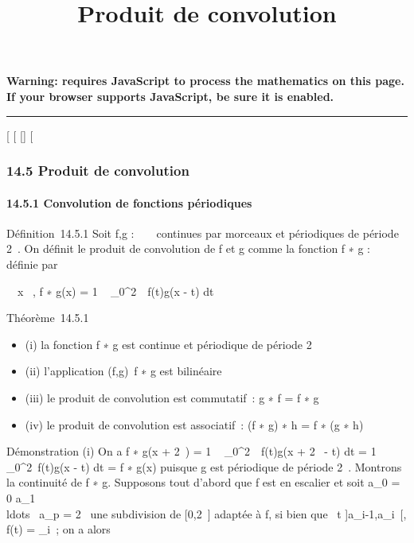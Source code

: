 \documentclass[]{article}
\title{Produit de convolution}
\author{}
\date{}
\begin{document}
\maketitle

\textbf{Warning: 
requires JavaScript to process the mathematics on this page.\\ If your
browser supports JavaScript, be sure it is enabled.}

\begin{center}\rule{3in}{0.4pt}\end{center}

[
[
[]
[

\subsubsection{14.5 Produit de convolution}

\paragraph{14.5.1 Convolution de fonctions périodiques}

Définition~14.5.1 Soit f,g : ~ \rightarrow~  continues par morceaux et périodiques
de période 2\pi~. On définit le produit de convolution de f et g comme la
fonction f ∗ g : ~ \rightarrow~  définie par

\forall~~x \in {}~, f ∗ g(x) = 1 \pi~ \int  _0^2\pi~~f(t)g(x - t) dt

Théorème~14.5.1

\begin{itemize}
\itemsep1pt\parskip0pt
\item
  (i) la fonction f ∗ g est continue et périodique de période 2\pi~
\item
  (ii) l'application (f,g)\mapsto~f ∗ g est
  bilinéaire
\item
  (iii) le produit de convolution est commutatif~: g ∗ f = f ∗ g
\item
  (iv) le produit de convolution est associatif~: (f ∗ g) ∗ h = f ∗ (g ∗
  h)
\end{itemize}

Démonstration (i) On a f ∗ g(x + 2\pi~) = 1 \pi~
\int  _0^2\pi~~f(t)g(x + 2\pi~ - t) dt
= 1 \pi~ \int ~
_0^2\pi~f(t)g(x - t) dt = f ∗ g(x) puisque g est périodique
de période 2\pi~. Montrons la continuité de f ∗ g. Supposons tout d'abord
que f est en escalier et soit a_0 = 0 \leq a_1
\leq\\ldots~ \leq
a_p = 2\pi~ une subdivision de [0,2\pi~] adaptée à f, si bien que
\forall~t \in]a_i-1,a_i~[, f(t) =
\lambda_i~; on a alors
\end{document}
